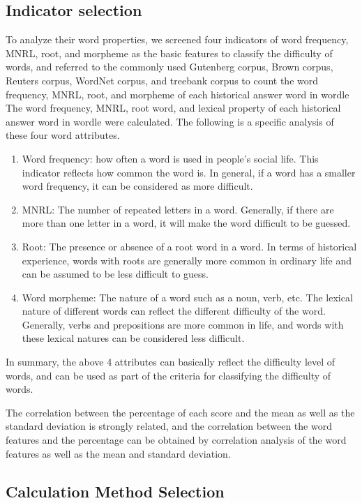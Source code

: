 \documentclass[12pt]{article}  %
\begin{document}
\subsection{Indicator selection}
To analyze their word properties, we screened four indicators of word frequency, MNRL, root, and morpheme as the basic features to classify the difficulty of words, and referred to the commonly used Gutenberg corpus, Brown corpus, Reuters corpus, WordNet corpus, and treebank corpus to count the word frequency, MNRL, root, and morpheme of each historical answer word in wordle The word frequency, MNRL, root word, and lexical property of each historical answer word in wordle were calculated. The following is a specific analysis of these four word attributes.

\begin{enumerate}
	\item Word frequency: how often a word is used in people's social life. This indicator reflects how common the word is. In general, if a word has a smaller word frequency, it can be considered as more difficult.
	\item MNRL: The number of repeated letters in a word. Generally, if there are more than one letter in a word, it will make the word difficult to be guessed.
	\item Root: The presence or absence of a root word in a word. In terms of historical experience, words with roots are generally more common in ordinary life and can be assumed to be less difficult to guess.
	\item Word morpheme: The nature of a word such as a noun, verb, etc. The lexical nature of different words can reflect the different difficulty of the word. Generally, verbs and prepositions are more common in life, and words with these lexical natures can be considered less difficult.
\end{enumerate}

In summary, the above 4 attributes can basically reflect the difficulty level of words, and can be used as part of the criteria for classifying the difficulty of words.


The correlation between the percentage of each score and the mean as well as the standard deviation is strongly related, and the correlation between the word features and the percentage can be obtained by correlation analysis of the word features as well as the mean and standard deviation.

\subsection{Calculation Method Selection}
\end{document}
